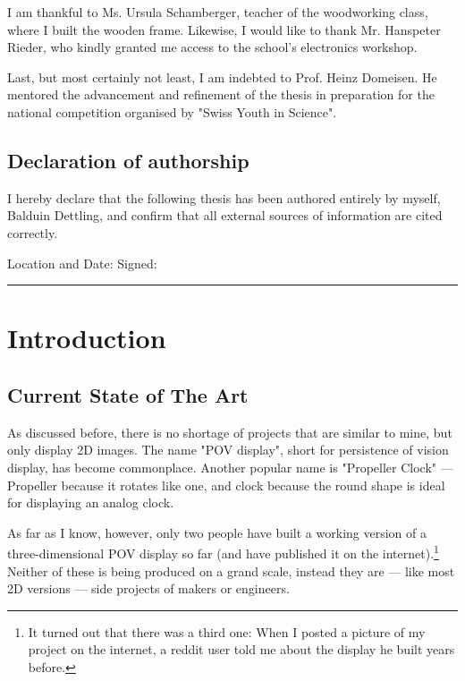 \documentclass[a4paper, 11pt, titlepage]{report}
\begin{document}
I am thankful to Ms. Ursula Schamberger, teacher of the woodworking class, where I built the
wooden frame. Likewise, I would like to thank Mr. Hanspeter Rieder, who kindly granted me
access to the school's electronics workshop.

Last, but most certainly not least, I am indebted to Prof. Heinz Domeisen. He mentored the
advancement and refinement of the thesis in preparation for the national competition organised
by "Swiss Youth in Science".

\section*{Declaration of authorship}

I hereby declare that the following thesis has been authored entirely by myself, Balduin
Dettling, and confirm that all external sources of information are cited correctly.

\vspace{10mm}
\noindent Location and Date: \hspace{0.35\textwidth} Signed:\\
\rule[3mm]{\textwidth}{0.5pt}



\tableofcontents



\chapter{Introduction}


\section{Current State of The Art}

As discussed before, there is no shortage of projects that are similar to mine, but only
display 2D images. The name "POV display", short for persistence of vision display, has become
commonplace. Another popular name is "Propeller Clock" --- Propeller because it rotates like one,
and clock because the round shape is ideal for displaying an analog clock.

As far as I know, however, only two people have built a working version of a three-dimensional
POV display so far (and have published it on the internet).\footnote{It turned out that there was
a third one: When I posted a picture of my project on the internet, a reddit user told me about
the display he built years before.}
Neither of these is being produced on a grand scale, instead they are --- like most 2D versions
--- side projects of makers or engineers.
\end{document}

